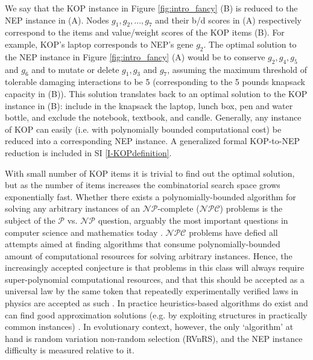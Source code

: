 \documentclass[12pt]{article}
\newcommand{\myC}[1]{{$\mathcal{#1}$}}
\begin{document}
We say that the KOP instance in Figure \ref{fig:intro_fancy} (B) is reduced to the NEP instance in (A). Nodes $g_1, g_2, ..., g_7$ and their b/d scores in  (A) respectively correspond to the items and value/weight scores of the KOP items  (B). For example, KOP's laptop corresponds to NEP's gene $g_2$. The optimal solution to the NEP instance in Figure \ref{fig:intro_fancy} (A) would be to conserve $g_2, g_4,  g_5$ and  $g_6$ and to mutate or delete $g_1, g_3$ and $g_7$, assuming the maximum threshold of tolerable damaging interactions to be 5 (corresponding to the 5 pounds knapsack capacity in (B)). This solution translates back to an optimal solution to the KOP instance in (B):  include in the knapsack the laptop, lunch box, pen and water bottle, and exclude the notebook, textbook, and candle. Generally, any instance of KOP can easily (i.e. with polynomially bounded computational cost) be reduced into a corresponding  NEP instance. A generalized formal KOP-to-NEP reduction is included in SI \ref{I-KOPdefinition}.

With small number of KOP items it is trivial to find out the optimal solution, but as the number of items increases the combinatorial search space grows exponentially fast. Whether there exists a polynomially-bounded algorithm for solving any arbitrary instances of an \myC{NP}-complete (\myC{NPC}) problems is the subject of the \myC{P} vs. \myC{NP} question, arguably the most important questions in computer science and mathematics today \cite{aaronson_limits_2004, aaronson_guest_2005, fortnow_status_2009}. \myC{NPC} problems have defied all attempts aimed at finding algorithms that consume polynomially-bounded amount of computational resources for solving arbitrary instances. Hence, the increasingly accepted conjecture is that problems in this class will always require super-polynomial computational resources, and that this should be accepted as a universal law by the same token that repeatedly experimentally verified laws in physics are accepted as such \cite{wigderson_opening_2014}.
%
In practice heuristics-based algorithms do exist and can find good approximation solutions (e.g. by exploiting structures in practically common instances) \cite{vazirani_approximation_2013,lawler_fast_1979}. In evolutionary context, however, the only `algorithm' at hand is random variation non-random selection (RVnRS), and the NEP instance difficulty is measured relative to it.
\end{document}
